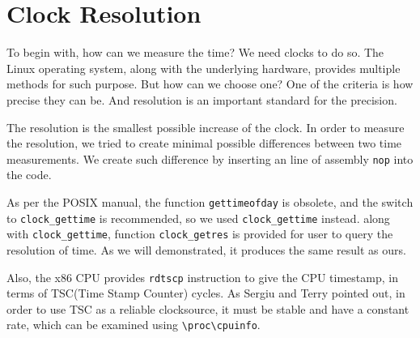 \section{Clock Resolution}

To begin with, how can we measure the time? We need clocks to do so. The Linux operating system, along with the underlying hardware, provides multiple methods for such purpose. But how can we choose one? One of the criteria is how precise they can be. And resolution is an important standard for the precision.

The resolution is the smallest possible increase of the clock. In order to measure the resolution, we tried to create minimal possible differences between two time measurements. We create such difference by inserting an line of assembly \texttt{nop} into the code. 

As per the POSIX manual\cite{posix_clock_gettime}, the function \texttt{gettimeofday} is obsolete, and the switch to \texttt{clock\_gettime} is recommended, so we used \texttt{clock\_gettime} instead. along with \texttt{clock\_gettime}, function \texttt{clock\_getres} is provided for user to query the resolution of time. As we will demonstrated, it produces the same result as ours.

Also, the x86 CPU provides \texttt{rdtscp} instruction to give the CPU timestamp, in terms of TSC(Time Stamp Counter) cycles. As Sergiu and Terry pointed out, in order to use TSC as a reliable clocksource, it must be stable and have a constant rate, which can be examined using \texttt{\textbackslash{}proc\textbackslash{}cpuinfo}\cite{constant_tsc}.